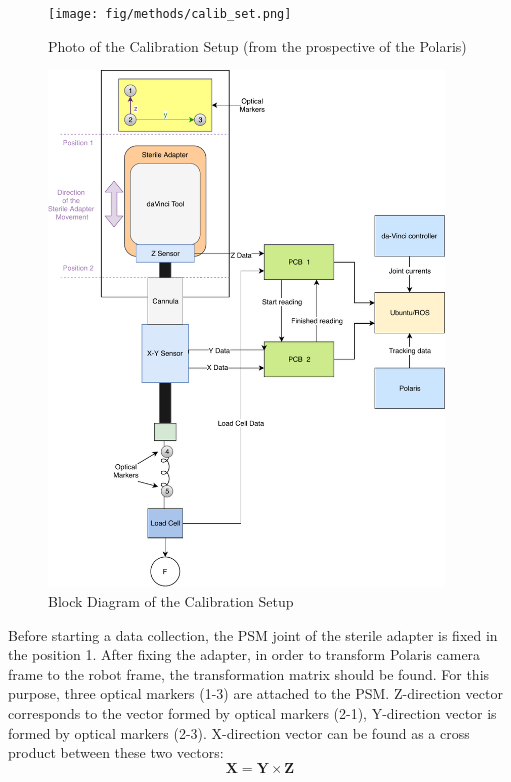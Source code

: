 \begin{figure}[h]
	\begin{center}
	\texttt{[image: fig/methods/calib\_set.png]}
	\end{center}
	\vspace{-4mm}
	\caption[Photo of the Calibration Setup]
	{Photo of the Calibration Setup (from the prospective of the Polaris)}
	\label{fig:Calib_setup_photo}
	\vspace{-2mm}
\end{figure}
	
\begin{figure}[h]
	\begin{center}
	\includegraphics[width=105mm]{fig/methods/block_diagram_of_calib_setup.pdf}
	\end{center}
	\vspace{-4mm}
	\caption[Block Diagram of the Calibration Setup]
	{Block Diagram of the Calibration Setup}
	\label{fig:Calib_setup_BD}
	\vspace{-2mm}
\end{figure}

	Before starting a data collection, the PSM joint of the sterile adapter is fixed in the position 1. After fixing the adapter, in order to transform Polaris camera frame to the robot frame, the transformation matrix should be found. For this purpose, three optical markers (1-3) are attached to the PSM. Z-direction vector corresponds to the vector formed by optical markers (2-1), Y-direction vector is formed by optical markers (2-3). X-direction vector can be found as a cross product between these two vectors:
\begin{equation}
\mathbf{X} = \mathbf{Y}\times \mathbf{Z}
\end{equation}

